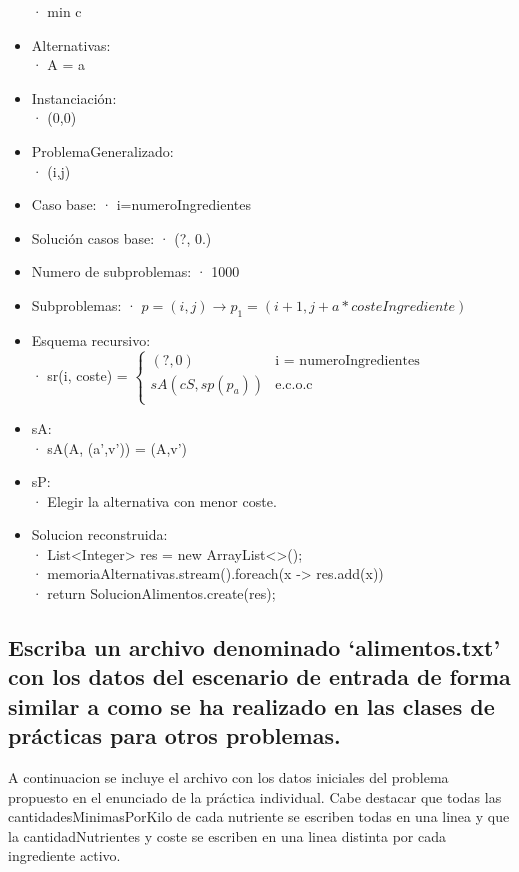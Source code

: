 \documentclass[a4paper,12pt]{article}
\begin{document}
\begin{itemize}
        · min c
  \item Alternativas:\\
        · A = {a \in [1,1000]}
  \item Instanciación:\\
        · (0,0)
  \item ProblemaGeneralizado:\\
        · (i,j)
  \item Caso base:
        · i=numeroIngredientes
  \item Solución casos base:
        · (?, 0.)
  \item Numero de subproblemas:
        · 1000
  \item Subproblemas:
        · $p = (i,j) \rightarrow p_1 = (i+1, j+a*costeIngrediente)$
  \item Esquema recursivo:\\
        · sr(i, coste) = $\begin{cases}
        (?,0)  &\mbox{i = numeroIngredientes}\\
        sA(cS, sp(p_a)) &\mbox{e.c.o.c}\\

        \end{cases}$

  \item sA:\\
        · sA(A, (a',v')) = (A,v')
  \item sP:\\
        · Elegir la alternativa con menor coste.
  \item Solucion reconstruida:\\
        · List<Integer> res = new ArrayList<>();\\
        · memoriaAlternativas.stream().foreach(x -> res.add(x))\\
        · return SolucionAlimentos.create(res);\\

\end{itemize}




\subsection{Escriba un archivo denominado `alimentos.txt' con los datos del escenario de entrada de forma similar a como se ha realizado en las clases de prácticas para otros problemas.}
A continuacion se incluye el archivo con los datos iniciales del problema propuesto en el enunciado de la práctica individual.
Cabe destacar que todas las cantidadesMinimasPorKilo de cada nutriente se escriben todas en una linea
y que la cantidadNutrientes y coste se escriben en una linea distinta por cada ingrediente activo.
\inputminted[fontsize=\footnotesize,breaklines]{text}{ficheros/alimentos.txt}
\end{document}
